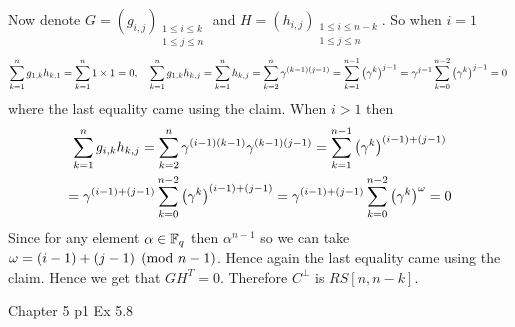 \documentclass[a4paper, 11pt]{article}
\begin{document}
{Now denote $G=(g_{i,j})_{\substack{1\leq i\leq k\\ 1\leq j\leq n}}$ and $H=(h_{i,j})_{\substack{1\leq i\leq n-k\\ 1\leq j\leq n}}$. So when $i=1$ $$\sum_{k=1}^ng_{1,k}h_{k,1}=\sum_{k=1}^n1\times 1=0,\quad \sum_{k=1}^ng_{1,k}h_{k,j}=\sum_{k=1}^n h_{k,j}=\sum_{k=2}^n \gamma^{(k-1)(j-1)}=\sum_{k=1}^{n-1}\left(\gamma^{k}\right)^{j-1}=\gamma^{j-1}\sum_{k=0}^{n-2}\left(\gamma^{k}\right)^{j-1}=0 \ $$where the last equality came using the claim. When $i>1$ then 
\begin{multline*}
	\sum_{k=1}^ng_{i,k}h_{k,j}=\sum_{k=2}^n \gamma^{(i-1)(k-1)}\gamma^{(k-1)(j-1)}=\sum_{k=1}^{n-1}\left(\gamma^{k}\right)^{(i-1)+(j-1)}\\
	=\gamma^{(i-1)+(j-1)}\sum_{k=0}^{n-2}\left(\gamma^{k}\right)^{(i-1)+(j-1)}=\gamma^{(i-1)+(j-1)}\sum_{k=0}^{n-2}\left(\gamma^{k}\right)^{\omega}=0
\end{multline*}Since for any element $\alpha\in \mathbb{F}_q$ then $\alpha^{n-1}$ so we can take $\omega=(i-1)+(j-1)\pmod{n-1}$.  Hence  again the last equality came using the claim. Hence we get that $GH^T=0$. Therefore $C^{\perp}$ is $RS[n,n-k]$.
}

\begin{problem}{%
		Chapter 5
	}{p1
	}
	Ex 5.8		
\end{problem}
\end{document}
